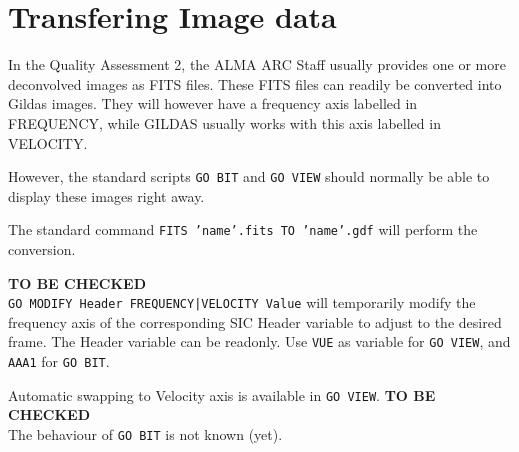 \documentclass[11pt]{article}
\begin{document}
\section{Transfering Image data}

In the Quality Assessment 2, the ALMA ARC Staff usually provides one
or more deconvolved images as FITS files.  These FITS files can readily
be converted into Gildas images. They will however have a frequency
axis labelled in FREQUENCY, while GILDAS usually works with this
axis labelled in VELOCITY. 

However, the standard scripts \texttt{GO BIT} and \texttt{GO VIEW} 
should normally be able to display these images right away.

The standard command
\texttt{FITS 'name'.fits TO 'name'.gdf}
will perform the conversion. 


\textbf{TO BE CHECKED}\\
\texttt{GO MODIFY Header FREQUENCY|VELOCITY Value}
will temporarily modify the frequency axis of the corresponding
SIC Header variable to adjust to the desired frame. The Header
variable can be readonly. Use \texttt{VUE} as variable for \texttt{GO VIEW},
and \texttt{AAA1} for \texttt{GO BIT}.

Automatic swapping to Velocity axis is available in \texttt{GO VIEW}.
\textbf{TO BE CHECKED}\\
The behaviour of \texttt{GO BIT} is not known (yet).
\end{document}
